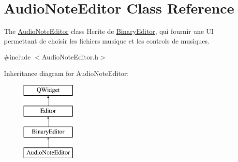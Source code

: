 \hypertarget{class_audio_note_editor}{\section{Audio\-Note\-Editor Class Reference}
\label{class_audio_note_editor}
}


The \hyperlink{class_audio_note_editor}{Audio\-Note\-Editor} class Herite de \hyperlink{class_binary_editor}{Binary\-Editor}, qui fournir une U\-I permettant de choisir les fichiers musique et les controls de musiques.  




{\ttfamily \#include $<$Audio\-Note\-Editor.\-h$>$}

Inheritance diagram for Audio\-Note\-Editor\-:\begin{figure}[H]
\begin{center}
\leavevmode
\includegraphics[height=4.000000cm]{class_audio_note_editor}
\end{center}
\end{figure}

